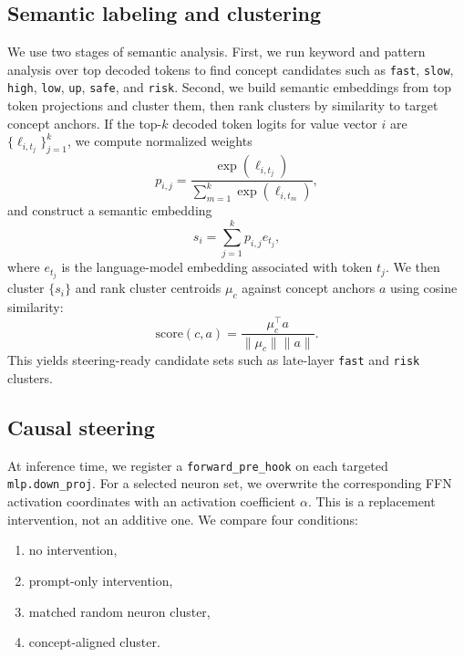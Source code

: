 \documentclass[11pt]{article}
\begin{document}
\subsection{Semantic labeling and clustering}

We use two stages of semantic analysis. First, we run keyword and pattern analysis over top decoded tokens to find concept candidates such as \texttt{fast}, \texttt{slow}, \texttt{high}, \texttt{low}, \texttt{up}, \texttt{safe}, and \texttt{risk}. Second, we build semantic embeddings from top token projections and cluster them, then rank clusters by similarity to target concept anchors. If the top-$k$ decoded token logits for value vector $i$ are $\{\ell_{i,t_j}\}_{j=1}^k$, we compute normalized weights
\begin{equation}
p_{i,j} = \frac{\exp(\ell_{i,t_j})}{\sum_{m=1}^{k}\exp(\ell_{i,t_m})},
\end{equation}
and construct a semantic embedding
\begin{equation}
s_i = \sum_{j=1}^{k} p_{i,j} e_{t_j},
\label{eq:semantic-embedding}
\end{equation}
where $e_{t_j}$ is the language-model embedding associated with token $t_j$. We then cluster $\{s_i\}$ and rank cluster centroids $\mu_c$ against concept anchors $a$ using cosine similarity:
\begin{equation}
\mathrm{score}(c,a)=\frac{\mu_c^\top a}{\|\mu_c\|\|a\|}.
\label{eq:cosine-ranking}
\end{equation}
This yields steering-ready candidate sets such as late-layer \texttt{fast} and \texttt{risk} clusters.

\subsection{Causal steering}

At inference time, we register a \texttt{forward\_pre\_hook} on each targeted \texttt{mlp.down\_proj}. For a selected neuron set, we overwrite the corresponding FFN activation coordinates with an activation coefficient $\alpha$. This is a replacement intervention, not an additive one. We compare four conditions:
\begin{enumerate}
    \item no intervention,
    \item prompt-only intervention,
    \item matched random neuron cluster,
    \item concept-aligned cluster.
\end{enumerate}
\end{document}
